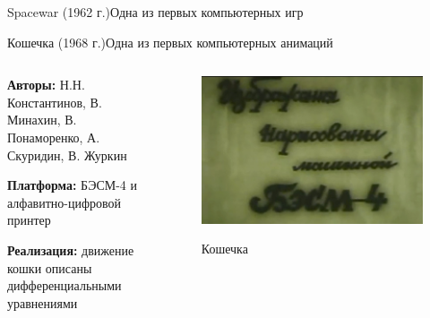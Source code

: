 \documentclass{beamer}
\begin{document}
\begin{frame}{Spacewar (1962 г.)}{Одна из первых компьютерных игр}
{		%
		
		
		
	}
	
	\end{frame}

\begin{frame}{Кошечка (1968 г.)}{Одна из первых компьютерных анимаций}
	
	\begin{columns}
		\begin{column}{0.5\textwidth}
			
			\textbf{Авторы:} Н.Н. Константинов, В. Минахин, В. Понаморенко, А. Скуридин, В. Журкин
			
			\textbf{Платформа:} БЭСМ-4 и алфавитно-цифровой принтер
			
			\textbf{Реализация:} движение кошки описаны дифференциальными уравнениями
			
		\end{column}
		\begin{column}{0.5\textwidth}
			\begin{figure}
				\href{https://www.youtube.com/watch?v=LzMk5sC6eAU}{
				\includegraphics[width=\textwidth]{images/AnimatedCat.jpg}
				}
				\caption {Кошечка}
			\end{figure}
		\end{column}
	\end{columns}
\end{frame}
\end{document}

